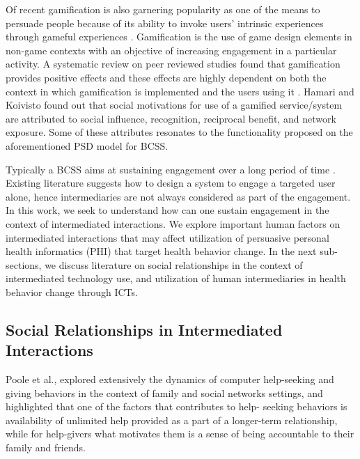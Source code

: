 \documentclass{sig-alternate}
\begin{document}
Of recent gamification is also garnering popularity as one of the means to
persuade people because of its ability to invoke users' intrinsic experiences
through gameful experiences \cite{hamari2014persuasive}. Gamification is the
use of game design elements in non-game contexts \cite{deterding2011game} with
an objective of increasing engagement in a particular activity. A systematic
review on peer reviewed studies found that gamification provides positive
effects and these effects are highly dependent on both the context in which
gamification is implemented and the users using it \cite{hamari2014does}.
Hamari and Koivisto \cite{hamari2013social} found out that social motivations
for use of a gamified service/system are attributed to social influence,
recognition, reciprocal benefit, and network exposure. Some of these
attributes resonates to the functionality proposed on the aforementioned PSD
model for BCSS.

Typically a BCSS aims at sustaining engagement over a long period of time
\cite{Oinas-Kukkonen:foundation}. Existing literature suggests how to design a
system to engage a targeted user alone, hence intermediaries are not always
considered as part of the engagement. In this work, we seek to understand how
can one sustain engagement in the context of intermediated interactions. We
explore important human factors on intermediated interactions that may affect
utilization of persuasive personal health informatics (PHI) that target health
behavior change. In the next sub-sections, we discuss literature on social
relationships in the context of intermediated technology use, and utilization
of human intermediaries in health behavior change through ICTs.

\subsection{Social Relationships in Intermediated Interactions}

Poole et al.\cite{poole:chh}, explored extensively the dynamics of computer
help-seeking and giving behaviors in the context of family and social networks
settings, and highlighted that one of the factors that contributes to help-
seeking behaviors is availability of unlimited help provided as a part of a
longer-term relationship, while for help-givers what motivates them is a sense
of being accountable to their family and friends.
\end{document}
